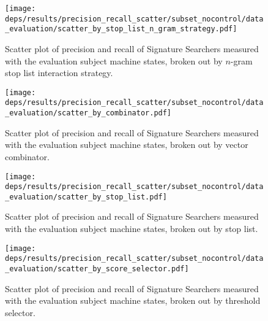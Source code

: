 \documentclass[11pt]{ucthesis}
\theoremstyle{plain}
\theoremstyle{definition}
\begin{document}
\begin{appendix}
\begin{figure}
  \centering
  \texttt{[image: deps/results/precision\_recall\_scatter/subset\_nocontrol/data\_evaluation/scatter\_by\_stop\_list\_n\_gram\_strategy.pdf]}
  \caption{Scatter plot of precision and recall of Signature Searchers measured with the evaluation subject machine states, broken out by $n$-gram stop list interaction strategy.}
  \label{fig:spbo:stoplistngramstrategy}
\end{figure}

\begin{figure}
  \centering
  \texttt{[image: deps/results/precision\_recall\_scatter/subset\_nocontrol/data\_evaluation/scatter\_by\_combinator.pdf]}
  \caption{Scatter plot of precision and recall of Signature Searchers measured with the evaluation subject machine states, broken out by vector combinator.}
  \label{fig:spbo:repetitions}
\end{figure}

\begin{figure}
  \centering
  \texttt{[image: deps/results/precision\_recall\_scatter/subset\_nocontrol/data\_evaluation/scatter\_by\_stop\_list.pdf]}
  \caption{Scatter plot of precision and recall of Signature Searchers measured with the evaluation subject machine states, broken out by stop list.}
  \label{fig:spbo:stoplist}
\end{figure}

\begin{figure}
  \centering
  \texttt{[image: deps/results/precision\_recall\_scatter/subset\_nocontrol/data\_evaluation/scatter\_by\_score\_selector.pdf]}
  \caption{Scatter plot of precision and recall of Signature Searchers measured with the evaluation subject machine states, broken out by threshold selector.}
  \label{fig:spbo:scoreselector}
\end{figure}

\end{appendix}




\end{document}
